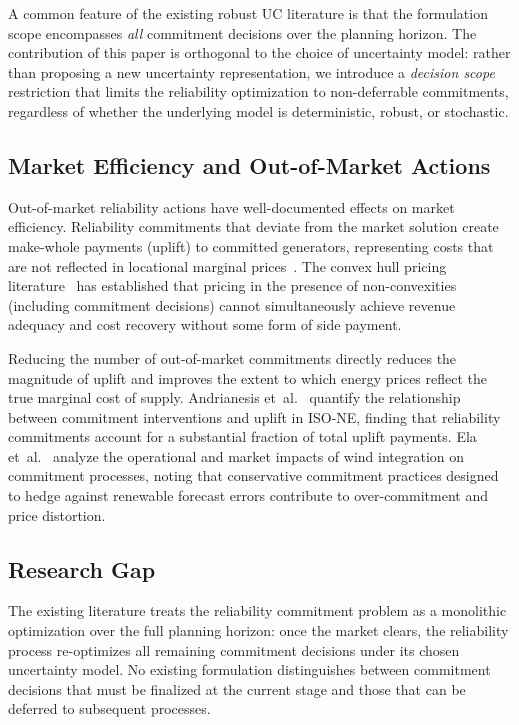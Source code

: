 \documentclass[journal]{IEEEtran}
\begin{document}
A common feature of the existing robust UC literature is that
the formulation scope encompasses \emph{all} commitment decisions
over the planning horizon.
The contribution of this paper is orthogonal to the choice of
uncertainty model: rather than proposing a new uncertainty
representation, we introduce a \emph{decision scope} restriction
that limits the reliability optimization to non-deferrable
commitments, regardless of whether the underlying model is
deterministic, robust, or stochastic.

\subsection{Market Efficiency and Out-of-Market Actions}

Out-of-market reliability actions have well-documented effects on
market efficiency.
Reliability commitments that deviate from the market solution
create make-whole payments (uplift) to committed generators,
representing costs that are not reflected in locational marginal
prices~\cite{hogan2003minimum, oneill2005efficient}.
The convex hull pricing literature~\cite{gribik2007market, schiro2016convex} has established that pricing in the presence of
non-convexities (including commitment decisions) cannot
simultaneously achieve revenue adequacy and cost recovery without
some form of side payment.

Reducing the number of out-of-market commitments directly
reduces the magnitude of uplift and improves the extent to which
energy prices reflect the true marginal cost of supply.
Andrianesis et~al.~\cite{andrianesis2022computation} quantify the
relationship between commitment interventions and uplift in
ISO-NE, finding that reliability commitments account for a
substantial fraction of total uplift payments.
Ela et~al.~\cite{ela2011operating} analyze the operational and market
impacts of wind integration on commitment processes, noting that
conservative commitment practices designed to hedge against
renewable forecast errors contribute to over-commitment and
price distortion.

\subsection{Research Gap}

The existing literature treats the reliability commitment problem
as a monolithic optimization over the full planning horizon:
once the market clears, the reliability process re-optimizes all
remaining commitment decisions under its chosen uncertainty model.
No existing formulation distinguishes between commitment decisions
that must be finalized at the current stage and those that can be
deferred to subsequent processes.
\end{document}
